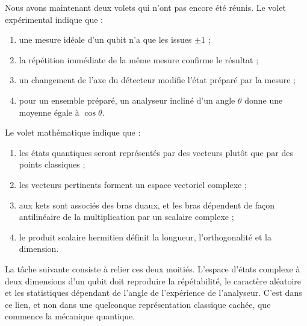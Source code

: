 Nous avons maintenant deux volets qui n’ont pas encore été réunis. Le volet expérimental indique que :
\begin{enumerate}
  \item une mesure idéale d’un qubit n’a que les issues \(\pm1\) ;
  \item la répétition immédiate de la même mesure confirme le résultat ;
  \item un changement de l’axe du détecteur modifie l’état préparé par la mesure ;
  \item pour un ensemble préparé, un analyseur incliné d’un angle \(\theta\) donne une moyenne égale à \(\cos\theta\).
\end{enumerate}
Le volet mathématique indique que :
\begin{enumerate}
  \item les états quantiques seront représentés par des vecteurs plutôt que par des points classiques ;
  \item les vecteurs pertinents forment un espace vectoriel complexe ;
  \item aux kets sont associés des bras duaux, et les bras dépendent de façon antilinéaire de la multiplication par un scalaire complexe ;
  \item le produit scalaire hermitien définit la longueur, l’orthogonalité et la dimension.
\end{enumerate}

La tâche suivante consiste à relier ces deux moitiés. L’espace d’états complexe à deux dimensions d’un qubit doit reproduire la répétabilité, le caractère aléatoire et les statistiques dépendant de l’angle de l’expérience de l’analyseur. C’est dans ce lien, et non dans une quelconque représentation classique cachée, que commence la mécanique quantique.

